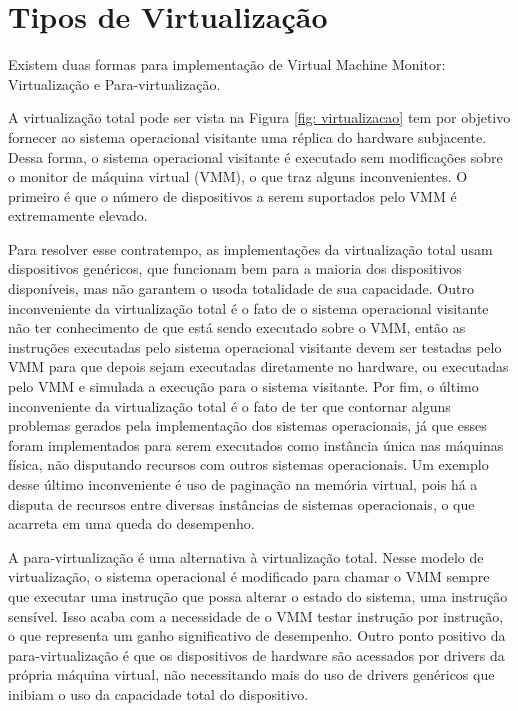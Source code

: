 \section{Tipos de Virtualização}
Existem duas formas para implementação de Virtual Machine Monitor: Virtualização e Para-virtualização.

A virtualização total pode ser vista na Figura  \ref{fig: virtualizacao} tem por objetivo fornecer ao sistema operacional visitante uma réplica do hardware subjacente. Dessa forma, o sistema operacional visitante é executado sem modificações sobre o monitor de máquina virtual (VMM), o que traz alguns inconvenientes. O
primeiro é que o número de dispositivos a serem suportados pelo VMM é extremamente elevado.

Para resolver esse contratempo, as implementações da virtualização total usam dispositivos genéricos, que funcionam bem para a maioria dos dispositivos disponíveis, mas não garantem o usoda totalidade de sua capacidade. Outro inconveniente da virtualização total é o fato de o sistema operacional visitante não ter conhecimento de que está sendo executado sobre o VMM, então as instruções executadas pelo sistema operacional visitante devem ser testadas pelo VMM para que depois sejam executadas diretamente no hardware, ou executadas pelo VMM e simulada a execução para o sistema visitante. Por fim, o último inconveniente da virtualização total é o fato de ter que contornar alguns problemas gerados pela implementação dos sistemas operacionais, já que esses foram implementados para serem executados como instância única nas máquinas física, não disputando recursos com outros sistemas operacionais. Um exemplo desse último inconveniente é
uso de paginação na memória virtual, pois há a disputa de recursos entre diversas instâncias de sistemas operacionais, o que acarreta em uma queda do desempenho.
 

    


A para-virtualização é uma alternativa à virtualização total. Nesse modelo de virtualização, o sistema operacional é modificado para chamar o VMM sempre que executar uma instrução que possa alterar o estado do sistema, uma instrução sensível. Isso acaba com a necessidade de o VMM testar instrução por instrução, o que representa um ganho significativo de desempenho. Outro ponto
positivo da para-virtualização é que os dispositivos de hardware são acessados por drivers da própria máquina virtual, não necessitando mais do uso de drivers genéricos que inibiam o uso da capacidade total do dispositivo.

